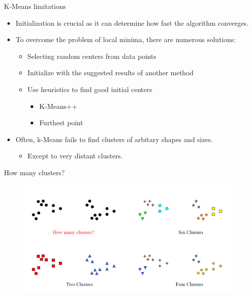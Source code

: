\documentclass[serif, aspectratio=169]{beamer}
\begin{document}
\begin{frame}{K-Means limitations}
    \begin{itemize}
        \item Initialization is crucial as it can determine how fast the algorithm converges.
        \item To overcome the problem of local minima, there are numerous solutions:
        \begin{itemize}
            \item Selecting random centers from data points
            \item Initialize with the suggested results of another method
            \item Use heuristics to find good initial centers 
            \begin{itemize}
                \item K-Means++
                \item Furthest point
            \end{itemize}
        \end{itemize}
        \item Often, k-Means fails to find clusters of arbitary shapes and sizes.
        \begin{itemize}
            \item Except to very distant clusters.
        \end{itemize}
    \end{itemize}
\end{frame}

\begin{frame}{How many clusters?}
    \begin{figure}
        \centering
        \includegraphics[scale=0.5]{pic/how_many_clusters.png}
    \end{figure}
\end{frame}
\end{document}
